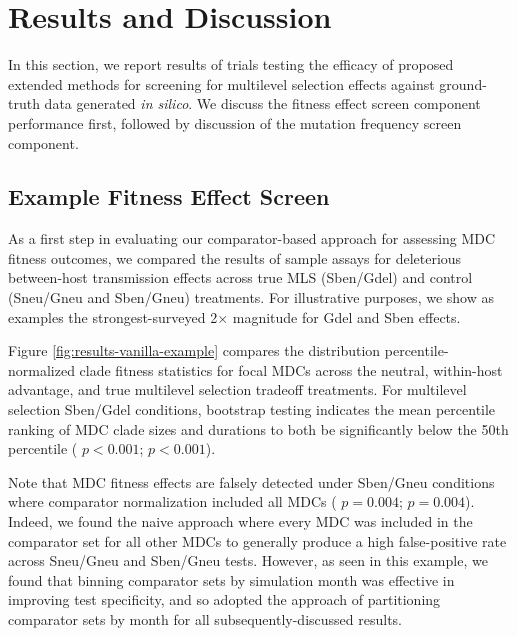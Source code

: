 \section{Results and Discussion} \label{sec:results}

% 
% 
% 
% 

In this section, we report results of trials testing the efficacy of proposed extended methods for screening for multilevel selection effects against ground-truth data generated \textit{in silico}.
We discuss the fitness effect screen component performance first, followed by discussion of the mutation frequency screen component.

\subsection{Example Fitness Effect Screen}



As a first step in evaluating our comparator-based approach for assessing MDC fitness outcomes, we compared the results of sample assays for deleterious between-host transmission effects across true MLS (Sben/Gdel) and control (Sneu/Gneu and Sben/Gneu) treatments.
For illustrative purposes, we show as examples the strongest-surveyed 2$\times$ magnitude for Gdel and Sben effects.

Figure \ref{fig:results-vanilla-example} compares the distribution percentile-normalized clade fitness statistics for focal MDCs across the neutral, within-host advantage, and true multilevel selection tradeoff treatments.
For multilevel selection Sben/Gdel conditions, bootstrap testing indicates the mean percentile ranking of MDC clade sizes and durations to both be significantly below the 50th percentile (%
$p<0.001$;
$p<0.001$).

Note that MDC fitness effects are falsely detected under Sben/Gneu conditions where comparator normalization included all MDCs (%
$p=0.004$;
$p=0.004$).
Indeed, we found the naive approach where every MDC was included in the comparator set for all other MDCs to generally produce a high false-positive rate across Sneu/Gneu and Sben/Gneu tests.
However, as seen in this example, we found that binning comparator sets by simulation month was effective in improving test specificity, and so adopted the approach of partitioning comparator sets by month for all subsequently-discussed results.

